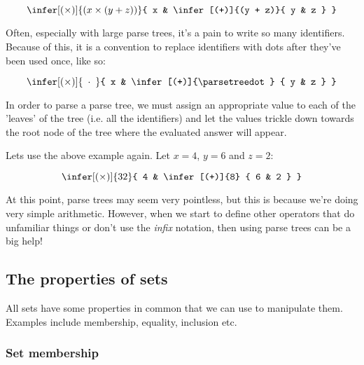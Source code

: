 
\begin{dmath*}
	\infer[(\times)]{(x \times (y + z))}{
		x
		&
		\infer[(+)]{(y + z)}{
			y
			&
			z
		}
	}
\end{dmath*}

Often, especially with large parse trees, it's a pain to write so many
identifiers. Because of this, it is a convention to replace identifiers with
dots after they've been used once, like so:

\begin{dmath*}
	\infer[(\times)]{\parsetreedot} {
		x
		&
		\infer[(+)]{\parsetreedot} {
			y
			&
			z
		}
	}
\end{dmath*}

In order to parse a parse tree, we must assign an appropriate value to each of
the 'leaves' of the tree (i.e. all the identifiers) and let the values trickle
down towards the root node of the tree where the evaluated answer will appear.

Lets use the above example again. Let $x = 4$, $y = 6$ and $z = 2$:

\begin{dmath*}
	\infer[(\times)]{32} {
		4
		&
		\infer[(+)]{8} {
			6
			&
			2
		}
	}
\end{dmath*}

At this point, parse trees may seem very pointless, but this is because we're
doing very simple arithmetic. However, when we start to define other operators
that do unfamiliar things or don't use the {\it infix} notation,
then using parse trees can be a big help!


\subsection{The properties of sets}
\label{subsec:properties_of_sets}

All sets have some properties in common that we can use to manipulate them.
Examples include membership, equality, inclusion etc.

\subsubsection{Set membership}

